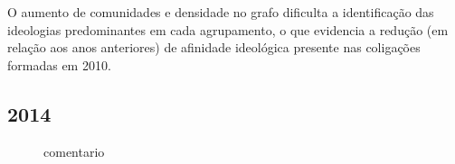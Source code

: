 O aumento de comunidades e densidade no grafo dificulta a identificação das ideologias predominantes em cada agrupamento, o que evidencia a redução (em relação aos anos anteriores) de afinidade ideológica presente nas coligações formadas em 2010.


\subsection{2014}
\label{resultados__grafos--2014}

\begin{figure}[H]
\center
    \qquad

    \caption{comentario}
\end{figure}

